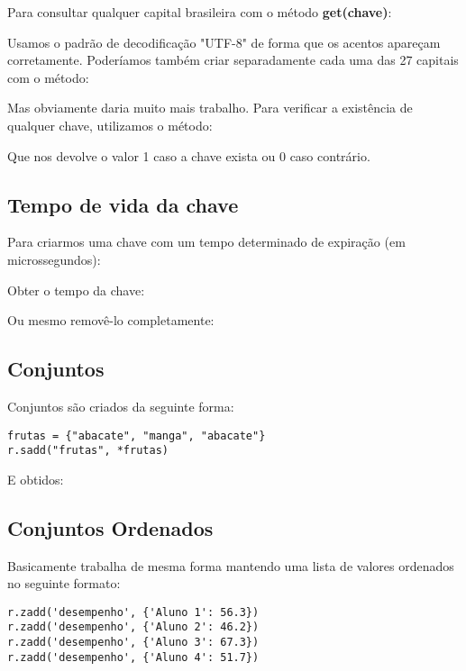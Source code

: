 Para consultar qualquer capital brasileira com o método \textbf{get(chave)}: \\

Usamos o padrão de decodificação "UTF-8" de forma que os acentos apareçam corretamente. Poderíamos também criar separadamente cada uma das 27 capitais com o método: \\

Mas obviamente daria muito mais trabalho. Para verificar a existência de qualquer chave, utilizamos o método:

Que nos devolve o valor 1 caso a chave exista ou 0 caso contrário. 

\subsection{Tempo de vida da chave}
Para criarmos uma chave com um tempo determinado de expiração (em microssegundos): \\

Obter o tempo da chave: \\

Ou mesmo removê-lo completamente: \\

\subsection{Conjuntos}
Conjuntos são criados da seguinte forma:
\begin{lstlisting}[]
frutas = {"abacate", "manga", "abacate"}
r.sadd("frutas", *frutas)
\end{lstlisting}

E obtidos: \\

\subsection{Conjuntos Ordenados}
Basicamente trabalha de mesma forma mantendo uma lista de valores ordenados no seguinte formato:
\begin{lstlisting}[]
r.zadd('desempenho', {'Aluno 1': 56.3})
r.zadd('desempenho', {'Aluno 2': 46.2})
r.zadd('desempenho', {'Aluno 3': 67.3})
r.zadd('desempenho', {'Aluno 4': 51.7})
\end{lstlisting}

